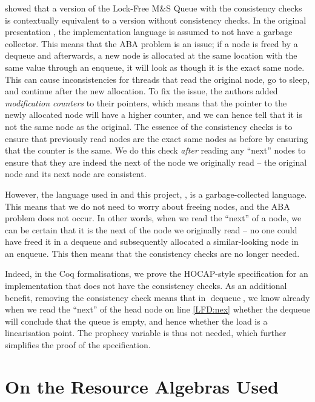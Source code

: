 \documentclass[a4paper, 10pt]{report}
\theoremstyle{definition}
\newcommand{\dequeue}{\operatorname{dequeue}}
\newcommand{\msq}{M\&S Queue}
\newcommand{\lfmsq}{Lock-Free \msq{}}
\begin{document}
\citet{DBLP:conf/cpp/VindumB21} showed that a version of the \lfmsq{} with the consistency checks is contextually equivalent to a version without consistency checks. In the original presentation \citep{DBLP:conf/podc/MichaelS96}, the implementation language is assumed to not have a garbage collector. This means that the ABA problem is an issue; if a node is freed by a dequeue and afterwards, a new node is allocated at the same location with the same value through an enqueue, it will look as though it is the exact same node. This can cause inconsistencies for threads that read the original node, go to sleep, and continue after the new allocation.
To fix the issue, the authors added \textit{modification counters} to their pointers, which means that the pointer to the newly allocated node will have a higher counter, and we can hence tell that it is not the same node as the original. The essence of the consistency checks is to ensure that previously read nodes are the exact same nodes as before by ensuring that the counter is the same.
We do this check \textit{after} reading any ``next'' nodes to ensure that they are indeed the next of the node we originally read -- the original node and its next node are consistent.

However, the language used in \citet{DBLP:conf/cpp/VindumB21} and this project, \heaplang, is a garbage-collected language. This means that we do not need to worry about freeing nodes, and the ABA problem does not occur. In other words, when we read the ``next'' of a node, we can be certain that it is the next of the node we originally read -- no one could have freed it in a dequeue and subsequently allocated a similar-looking node in an enqueue. This then means that the consistency checks are no longer needed.

Indeed, in the Coq formalisations, we prove the HOCAP-style specification for an implementation that does not have the consistency checks. As an additional benefit, removing the consistency check means that in $\dequeue$, we know already when we read the ``next'' of the head node on line \ref{LFD:nex} whether the dequeue will conclude that the queue is empty, and hence whether the load is a linearisation point. The prophecy variable is thus not needed, which further simplifies the proof of the specification.


\chapter{On the Resource Algebras Used}
\label{ch:RA}
\end{document}
